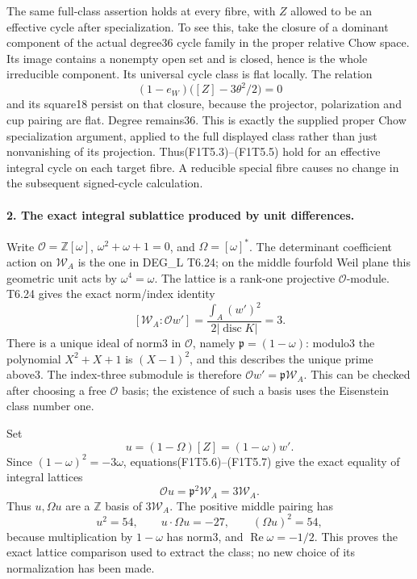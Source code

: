 The same full-class assertion holds at every fibre, with $Z$
allowed to be an effective cycle after specialization. To see this,
take the closure of a dominant component of the actual degree36
cycle family in the proper relative Chow space. Its image contains
a nonempty open set and is closed, hence is the whole irreducible
component. Its universal cycle class is flat locally. The relation
\[
 (1-e_W)\bigl([Z]-3\theta^2/2\bigr)=0
\]
and its square18 persist on that closure, because the projector,
polarization and cup pairing are flat. Degree remains36. This is
exactly the supplied proper Chow specialization argument, applied
to the full displayed class rather than just nonvanishing of its
projection. Thus(F1T5.3)--(F1T5.5) hold for an effective integral
cycle on each target fibre. A reducible special fibre causes no
change in the subsequent signed-cycle calculation.

\paragraph{2. The exact integral sublattice produced by unit differences.}
Write $\mathcal O=\mathbb Z[\omega]$, $\omega^2+\omega+1=0$,
and $\Omega=[\omega]^*$. The determinant coefficient action
on $\mathscr W_A$ is the one in DEG\_L T6.24; on the middle
fourfold Weil plane this geometric unit acts by
$\omega^4=\omega$. The lattice is a rank-one projective
$\mathcal O$-module. T6.24 gives the exact norm/index identity
\[
 [\mathscr W_A:\mathcal O w']
       =\frac{\int_A(w')^2}{2|\operatorname{disc}K|}=3.
 \tag{F1T5.6}
\]
There is a unique ideal of norm3 in $\mathcal O$, namely
$\mathfrak p=(1-\omega)$: modulo3 the polynomial
$X^2+X+1$ is $(X-1)^2$, and this describes the unique prime
above3. The index-three submodule is therefore
$\mathcal O w'=\mathfrak p\mathscr W_A$.
This can be checked after choosing a free $\mathcal O$ basis;
the existence of such a basis uses the Eisenstein class number one.

Set
\[
 u=(1-\Omega)[Z]=(1-\omega)w'.
 \tag{F1T5.7}
\]
Since $(1-\omega)^2=-3\omega$, equations(F1T5.6)--(F1T5.7)
give the exact equality of integral lattices
\[
 \mathcal O u=\mathfrak p^2\mathscr W_A=3\mathscr W_A.
 \tag{F1T5.8}
\]
Thus $u,\Omega u$ are a $\mathbb Z$ basis of $3\mathscr W_A$.
The positive middle pairing has
\[
 u^2=54,\qquad u\cdot\Omega u=-27,
                       \qquad(\Omega u)^2=54,
 \tag{F1T5.9}
\]
because multiplication by $1-\omega$ has norm3, and
$\operatorname{Re}\omega=-1/2$. This proves the exact lattice
comparison used to extract the class; no new choice of its
normalization has been made.

